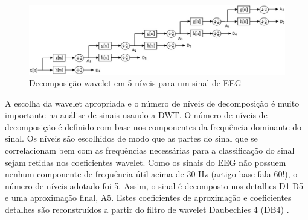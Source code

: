 \documentclass[10pt,journal,compsoc]{IEEEtran}
\begin{document}
\begin{figure}
	\centering\includegraphics[width=18cm]{imgs/dwt_5levels.png}
	\caption{Decomposição wavelet em 5 níveis para um sinal de EEG}
	\label{fig_dwt}
\end{figure}


A escolha da wavelet apropriada e o número de níveis de decomposição é muito importante na análise de sinais usando a DWT. O número de níveis de decomposição é definido com base nos componentes da frequência dominante do sinal. Os níveis são escolhidos de modo que as partes do sinal que se correlacionam bem com as frequências necessárias para a classificação do sinal sejam retidas nos coeficientes wavelet. Como os sinais do EEG não possuem nenhum componente de frequência útil acima de 30 Hz (artigo base fala 60!), o número de níveis adotado foi 5. Assim, o sinal é decomposto nos detalhes D1-D5 e uma aproximação final, A5. Estes coeficientes de aproximação e coeficientes detalhes são reconstruídos a partir do filtro de wavelet Daubechies 4 (DB4) \cite{Sharmila2017670}.



\end{document}
